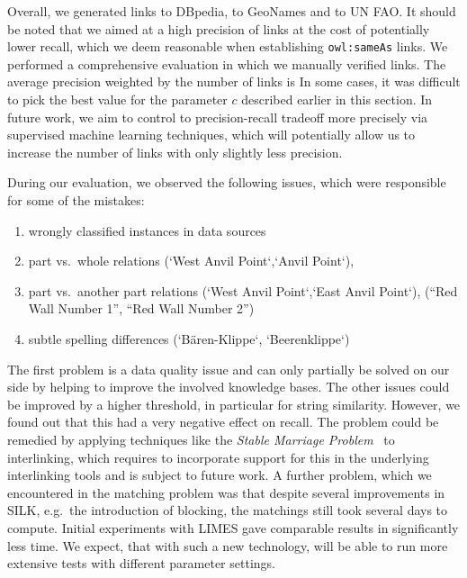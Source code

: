 Overall, we generated  links to DBpedia,  to GeoNames and  to UN FAO.
It should be noted that we aimed at a high precision of links at the cost of potentially lower recall, which we deem reasonable when establishing \verb|owl:sameAs| links.
We performed a comprehensive evaluation in which we manually verified  links.
The average precision weighted by the number of links is  %
In some cases, it was difficult to pick the best value for the parameter $c$ described earlier in this section.
In future work, we aim to control to precision-recall tradeoff more precisely via supervised machine learning techniques, which will potentially allow us to increase the number of links with only slightly less precision.

During our evaluation, we observed the following issues, which were responsible for some of the mistakes:
\begin{enumerate}
 \item wrongly classified instances in data sources
 \item part vs.~whole relations (`West Anvil Point`,`Anvil Point`),
 \item part vs.~another part relations (`West Anvil Point`,`East Anvil Point`), (``Red Wall Number 1'', ``Red Wall Number 2'')
 \item subtle spelling differences (`B{\"a}ren-Klippe`, `Beerenklippe`)
\end{enumerate}

The first problem is a data quality issue and can only partially be solved on our side by helping to improve the involved knowledge bases.
The other issues could be improved by a higher threshold, in particular for string similarity.
However, we found out that this had a very negative effect on recall.
The problem could be remedied by applying techniques like the
\emph{Stable Marriage Problem}~\cite{stable_marriage}
to interlinking, which requires to incorporate support for this in the underlying interlinking tools and is subject to future work.
A further problem, which we encountered in the matching problem was that despite several improvements in SILK, e.g.~the introduction of blocking, the matchings still took several days to compute. 
Initial experiments with LIMES gave comparable results in significantly less
time. We expect, that with such a new technology, will be able to run more
extensive tests with different parameter settings.


